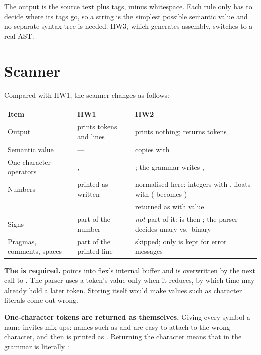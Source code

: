 \documentclass[12pt]{article}
\begin{document}
The output is the source text plus tags, minus whitespace. Each rule only has to decide where its tags
go, so a string is the simplest possible semantic value and no separate syntax tree is needed. HW3,
which generates assembly, switches to a real AST.

\section{Scanner}

Compared with HW1, the scanner changes as follows:

\begin{center}
\begin{tabularx}{\linewidth}{@{}lLL@{}}
\toprule
Item & HW1 & HW2 \\
\midrule
Output & prints tokens and lines & prints nothing; returns tokens \\
Semantic value & --- &  copies  with  \\
One-character operators & ,  & ; the grammar writes ,  \\
Numbers & printed as written & normalised here: integers with , floats with  ( becomes ) \\
 &  & returned as  with value  \\
Signs & part of the number & \emph{not} part of it:  is  then ; the parser decides unary vs.\ binary \\
Pragmas, comments, spaces & part of the printed line & skipped; only  is kept for error messages \\
\bottomrule
\end{tabularx}
\end{center}

\textbf{The  is required.}  points into flex's internal buffer and is overwritten
by the next call to . The parser uses a token's value only when it reduces, by which time
 may already hold a later token. Storing  itself would make values such as
character literals come out wrong.


\textbf{One-character tokens are returned as themselves.} Giving every symbol a name invites mix-ups:
names such as  and  are easy to attach to the wrong character, and
then  is printed as . Returning the character means that
 in the grammar is literally \code{(}:
\end{document}
